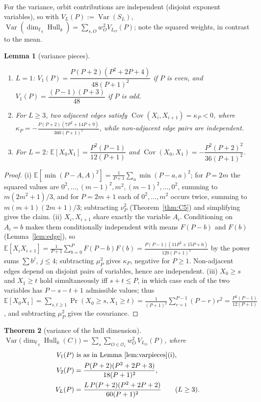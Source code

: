 \documentclass[10pt,journal,draftclsnofoot,onecolumn]{IEEEtran}
\newtheorem{theorem}{Theorem}[section]
\newtheorem{lemma}[theorem]{Lemma}
\theoremstyle{definition}
\theoremstyle{remark}
\newcommand{\Fq}{\mathbb{F}_q}
\newcommand{\Hull}{\operatorname{Hull}}
\newcommand{\E}{\mathbb{E}}
\begin{document}
For the variance, orbit contributions are independent (disjoint exponent
variables), so with \(V_L(P) := \operatorname{Var}(S_L)\),
\(\operatorname{Var}(\dim_{\Fq}\Hull_k) = \sum_{s,O} w_O^2 V_{L_O}(P)\);
note the squared weights, in contrast to the mean.

\begin{lemma}[variance pieces]\label{lem:varpieces}
\begin{enumerate}
\item[(i)] \(L=1\):
\(V_1(P) = \dfrac{P(P+2)(P^2+2P+4)}{48(P+1)^2}\) if \(P\) is even, and
\(V_1(P) = \dfrac{(P-1)(P+3)}{48}\) if \(P\) is odd.
\item[(ii)] For \(L \ge 3\), two adjacent edges satisfy
\(\operatorname{Cov}(X_i, X_{i+1}) = \kappa_P < 0\), where
\(\kappa_P = -\frac{P(P+2)(7P^2+14P+9)}{360(P+1)^2}\), while non-adjacent edge pairs
are independent.
\item[(iii)] For \(L=2\):
\(\E[X_0 X_1] = \dfrac{P^2(P-1)}{12(P+1)}\) and
\(\operatorname{Cov}(X_0,X_1) = -\dfrac{P^2(P+2)^2}{36(P+1)^2}\).
\end{enumerate}
\end{lemma}

\begin{proof}
(i) \(\E[\min(P-A,A)^2] = \frac{1}{P+1}\sum_a \min(P-a,a)^2\); for
\(P = 2m\) the squared values are \(0^2,\dots,(m-1)^2,m^2,(m-1)^2,\dots,0^2\),
summing to \(m(2m^2+1)/3\), and for \(P=2m+1\) each of \(0^2,\dots,m^2\)
occurs twice, summing to \(m(m+1)(2m+1)/3\); subtracting \(\nu_P^2\)
(Theorem~\ref{thm:C5}) and simplifying gives the claim.
(ii) \(X_i, X_{i+1}\) share exactly the variable \(A_i\). Conditioning on
\(A_i = b\) makes them conditionally independent with means
\(F(P-b)\) and \(F(b)\) (Lemma~\ref{lem:edge}), so
\(\E[X_iX_{i+1}] = \frac{1}{P+1}\sum_{b=0}^P F(P-b)F(b)
= \frac{P(P-1)(11P^2+15P+6)}{120(P+1)^2}\) by the power sums
\(\sum b^j\), \(j \le 4\); subtracting \(\mu_P^2\) gives \(\kappa_P\),
negative for \(P \ge 1\). Non-adjacent edges depend on disjoint pairs of
variables, hence are independent.
(iii) \(X_0 \ge s\) and \(X_1 \ge t\) hold simultaneously iff
\(s + t \le P\), in which case each of the two variables has
\(P-s-t+1\) admissible values; thus
\(\E[X_0X_1] = \sum_{s,t\ge1} \Pr(X_0\ge s, X_1\ge t)
= \frac{1}{(P+1)^2} \sum_{r=1}^{P-1} (P-r) r^2
= \frac{P^2(P-1)}{12(P+1)}\), and subtracting \(\mu_P^2\) gives the
covariance.
\end{proof}

\begin{theorem}[variance of the hull dimension]\label{thm:C6}
\(\displaystyle
\operatorname{Var}\big(\dim_{\Fq} \Hull_k(C)\big)
= \sum_{s} \sum_{O \in \mathcal{O}_s} w_O^2\, V_{L_O}(P)\), where
\[
\begin{aligned}
V_1(P) &\text{ is as in Lemma~\ref{lem:varpieces}(i)},\\
V_2(P) &= \frac{P(P+2)(P^2+2P+3)}{18(P+1)^2},\\
V_L(P) &= \frac{L\, P(P+2)(P^2+2P+2)}{60(P+1)^2} \qquad (L \ge 3).
\end{aligned}
\]
\end{theorem}
\end{document}
